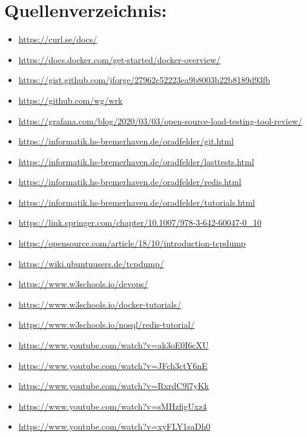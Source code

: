 \documentclass[a4paper,12pt,parskip=half,headsepline,DIV=12,numbers=noenddot]{scrartcl}
\begin{document}
\section {Quellenverzeichnis:}
\begin{itemize}
    \item \url{https://curl.se/docs/}
    \item \url{https://docs.docker.com/get-started/docker-overview/}
    \item \url{https://gist.github.com/jforge/27962c52223ea9b8003b22b8189d93fb}
    \item \url{https://github.com/wg/wrk}
    \item \url{https://grafana.com/blog/2020/03/03/open-source-load-testing-tool-review/}
    \item \url{https://informatik.hs-bremerhaven.de/oradfelder/git.html}
    \item \url{https://informatik.hs-bremerhaven.de/oradfelder/lasttests.html}
    \item \url{https://informatik.hs-bremerhaven.de/oradfelder/redis.html}
    \item \url{https://informatik.hs-bremerhaven.de/oradfelder/tutorials.html}
    \item \url{https://link.springer.com/chapter/10.1007/978-3-642-60047-0_10}
    \item \url{https://opensource.com/article/18/10/introduction-tcpdump}
    \item \url{https://wiki.ubuntuusers.de/tcpdump/}
    \item \url{https://www.w3schools.io/devops/}
    \item \url{https://www.w3schools.io/docker-tutorials/}
    \item \url{https://www.w3schools.io/nosql/redis-tutorial/}
    \item \url{https://www.youtube.com/watch?v=ak3oE0I6cXU}
    \item \url{https://www.youtube.com/watch?v=JFch3ctY6nE}
    \item \url{https://www.youtube.com/watch?v=RxrdC9l7yKk}
    \item \url{https://www.youtube.com/watch?v=sMHzfigUxz4}
    \item \url{https://www.youtube.com/watch?v=xyFLY1saDh0}
\end{itemize}
\newpage


\end{document}
